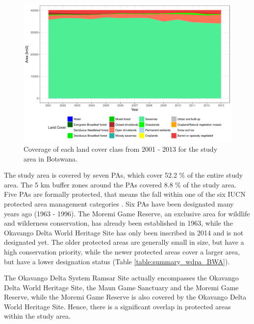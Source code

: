 \documentclass[12pt,a4paper, twoside, english]{article}
\begin{document}
\begin{figure}[H]
  \centering
  \includegraphics[width=\textwidth]{figures/MLC_Timeseries_BWA.png}
  \caption[Land cover time series of Ngamiland]{Coverage of each land cover class from 2001 - 2013 for the study area in Botswana.}
  \label{fig:mlc_ts_bwa}
\end{figure}


The study area is covered by seven PAs, which cover 52.2 \% of the entire study area. The 5 km buffer zones around the PAs covered 8.8 \% of the study area. Five PAs are formally protected, that means the fall within one of the six IUCN protected area management categories \citep{Dudley2008}. Six PAs have been designated many years ago (1963 - 1996). The Moremi Game Reserve, an exclusive area for wildlife and wilderness conservation, has already been established in 1963, while the Okavango Delta World Heritage Site has only been inscribed in 2014 and is not designated yet. The older protected areas are generally small in size, but have a high conservation priority, while the newer protected areas cover a larger area, but have a lower designation status (Table \ref{table:summary_wdpa_BWA}). 



The Okavango Delta System Ramsar Site actually encompasses the Okavango Delta World Heritage Site, the Maun Game Sanctuary and the Moremi Game Reserve, while the Moremi Game Reserve is also covered by the Okavango Delta World Heritage Site. Hence, there is a significant overlap in protected areas within the study area.
\end{document}
